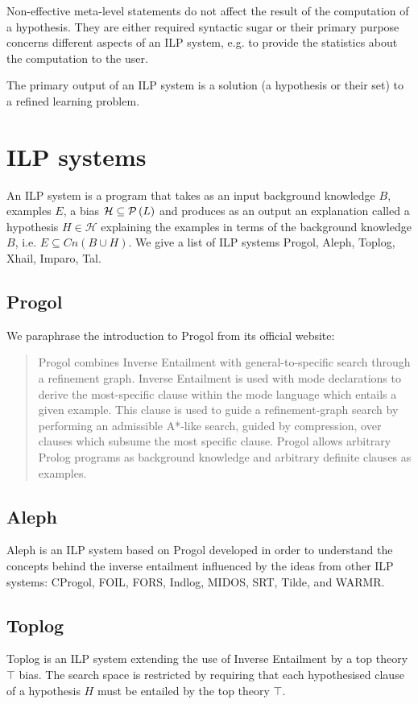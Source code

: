 Non-effective meta-level statements do not affect the result of the computation of a hypothesis. They are either required syntactic sugar or their primary purpose concerns different aspects of an ILP system, e.g. to provide the statistics about the computation to the user.

The primary output of an ILP system is a solution (a hypothesis or their set) to a refined learning problem.

\section{ILP systems}
An ILP system is a program that takes as an input background knowledge $B$, examples $E$, a bias $\mathcal{H} \subseteq \mathcal{P} \left({ L }\right)$ and produces as an output an explanation called a hypothesis $H \in \mathcal{H}$ explaining the examples in terms of the background knowledge $B$, i.e. $E \subseteq Cn(B \cup H)$.
We give a list of ILP systems Progol, Aleph, Toplog, Xhail, Imparo, Tal.

\subsection{Progol}
We paraphrase the introduction to Progol from its official website\cite{muggleton1999progolWebsite}:
\begin{quote}
Progol combines Inverse Entailment with general-to-specific search through a refinement graph. Inverse Entailment is used with mode declarations to derive the most-specific clause within the mode language which entails a given example. This clause is used to guide a refinement-graph search by performing an admissible A*-like search, guided by compression, over clauses which subsume the most specific clause. Progol allows arbitrary Prolog programs as background knowledge and arbitrary definite clauses as examples.
\end{quote}

\subsection{Aleph\cite{aleph2007}}
Aleph is an ILP system based on Progol developed in order to understand the concepts behind the inverse entailment\cite{muggleton1995inverse} influenced by the ideas from other ILP systems: CProgol, FOIL, FORS, Indlog, MIDOS, SRT, Tilde, and WARMR. 

\subsection{Toplog\cite{santos2008toplogWebsite}\cite{muggleton2008toplog}}
Toplog is an ILP system extending the use of Inverse Entailment by a top theory $\top$ bias.
The search space is restricted by requiring that each hypothesised clause of a hypothesis $H$ must be entailed by the top theory $\top$.

